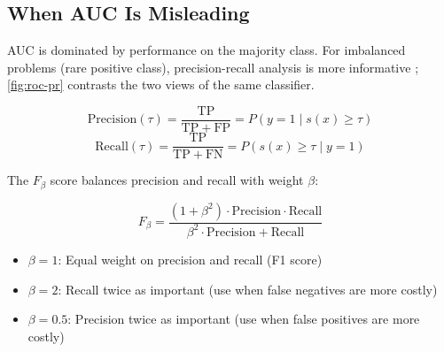 \subsection{When AUC Is Misleading}

AUC is dominated by performance on the majority class. For imbalanced problems (rare positive class), precision-recall analysis is more informative \autocite{davis2006relationship}; \cref{fig:roc-pr} contrasts the two views of the same classifier.

\[
\mathrm{Precision}(\tau) = \frac{\mathrm{TP}}{\mathrm{TP} + \mathrm{FP}} = P\!\left(y=1 \mid s(x) \geq \tau\right)
\]
\[
\mathrm{Recall}(\tau) = \frac{\mathrm{TP}}{\mathrm{TP} + \mathrm{FN}} = P\!\left(s(x) \geq \tau \mid y=1\right)
\]

The $F_\beta$ score balances precision and recall with weight $\beta$:

\[
F_\beta = \frac{(1 + \beta^2) \cdot \mathrm{Precision} \cdot \mathrm{Recall}}{\beta^2 \cdot \mathrm{Precision} + \mathrm{Recall}}
\]

\begin{itemize}
    \item $\beta = 1$: Equal weight on precision and recall (F1 score)
    \item $\beta = 2$: Recall twice as important (use when false negatives are more costly)
    \item $\beta = 0.5$: Precision twice as important (use when false positives are more costly)
\end{itemize}

